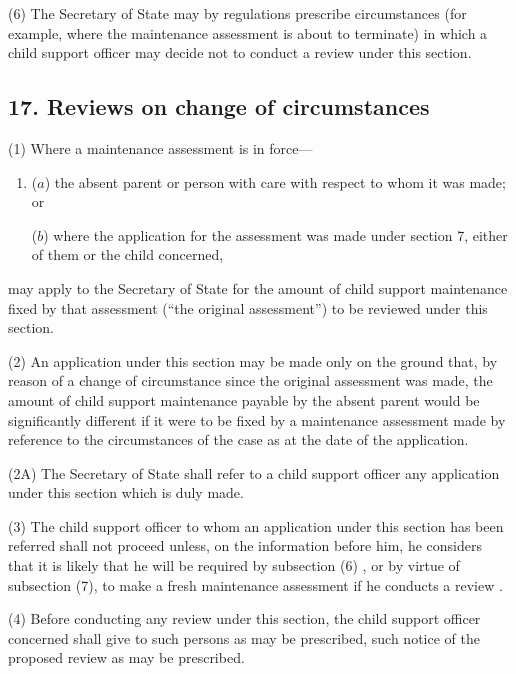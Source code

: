 \documentclass[12pt,a4paper]{article}
\begin{document}
(6) The Secretary of State may by regulations prescribe circumstances (for example, where the maintenance assessment is about to terminate) in which a child support officer may decide not to conduct a review under this section.


\subsection{17. Reviews on change of circumstances}

(1) Where a maintenance assessment is in force—
\begin{enumerate}\item[]
($a$) the absent parent or person with care with respect to whom it was made; or

($b$) where the application for the assessment was made under section 7, either of them or the child concerned,
\end{enumerate}
may apply to the Secretary of State for the amount of child support maintenance fixed by that assessment (“the original assessment”) to be reviewed under this section.

(2) An application under this section may be made only on the ground that, by reason of a change of circumstance since the original assessment was made, the amount of child support maintenance payable by the absent parent would be significantly different if it were to be fixed by a maintenance assessment made by reference to the circumstances of the case as at the date of the application.

(2A) The Secretary of State shall refer to a child support officer any application under this section which is duly made.

(3) The child support officer to whom an application under this section has been referred shall not proceed unless, on the information before him, he considers that it is likely that he will be required by subsection (6)%
, or by virtue of subsection (7),  %
to make a fresh maintenance assessment if he conducts 
a review%
.

(4) Before conducting any review under this section, the child support officer concerned shall give to such persons as may be prescribed, such notice of the proposed review as may be prescribed.
\end{document}
